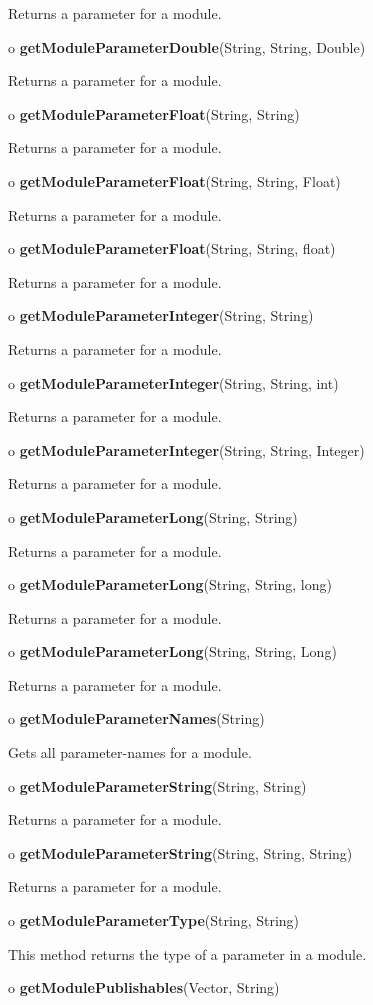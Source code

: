\begin{description}
Returns a parameter for a module.  
\item o {\bf getModuleParameterDouble}(String, String, Double)  

Returns a parameter for a module.  
\item o {\bf getModuleParameterFloat}(String, String)  

Returns a parameter for a module.  
\item o {\bf getModuleParameterFloat}(String, String, Float)  

Returns a parameter for a module.  
\item o {\bf getModuleParameterFloat}(String, String, float)  

Returns a parameter for a module.  
\item o {\bf getModuleParameterInteger}(String, String)  

Returns a parameter for a module.  
\item o {\bf getModuleParameterInteger}(String, String, int)  

Returns a parameter for a module.  
\item o {\bf getModuleParameterInteger}(String, String, Integer)  

Returns a parameter for a module.  
\item o {\bf getModuleParameterLong}(String, String)  

Returns a parameter for a module.  
\item o {\bf getModuleParameterLong}(String, String, long)  

Returns a parameter for a module.  
\item o {\bf getModuleParameterLong}(String, String, Long)  

Returns a parameter for a module.  
\item o {\bf getModuleParameterNames}(String)  

Gets all parameter-names for a module.  
\item o {\bf getModuleParameterString}(String, String)  

Returns a parameter for a module.  
\item o {\bf getModuleParameterString}(String, String, String)  

Returns a parameter for a module.  
\item o {\bf getModuleParameterType}(String, String)  

This method returns the type of a parameter in a module.  
\item o {\bf getModulePublishables}(Vector, String)  


\end{description}
